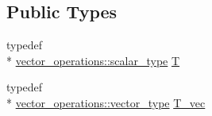 \subsection*{Public Types}
\begin{DoxyCompactItemize}
\item 
typedef \\*
\hyperlink{structcpu__vector__operations_aca6b216aa1fb172df83d98350e94fd61}{vector\-\_\-operations\-::scalar\-\_\-type} \hyperlink{classnumerical__algos_1_1newton__method__extended_1_1newton__solver__extended_a32ed9a6f34b0fcff996c913f4695e1c0}{T}
\item 
typedef \\*
\hyperlink{structcpu__vector__operations_a1962836df596ce262704d208e9a6d8f9}{vector\-\_\-operations\-::vector\-\_\-type} \hyperlink{classnumerical__algos_1_1newton__method__extended_1_1newton__solver__extended_a9271222e5554cc0824604ab062a2cace}{T\-\_\-vec}
\end{DoxyCompactItemize}
